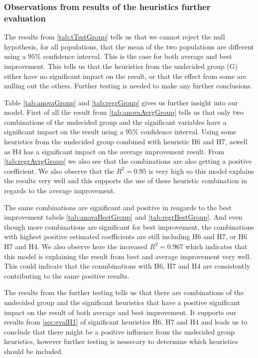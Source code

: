 \documentclass[../main.tex]{subfiles}
\begin{document}
\subsubsection{Observations from results of the heuristics further evaluation}
The results from \cref{tab:tTestGroup} tells us that we cannot reject the null hypothesis, for all populations, that the mean of the two populations are different using a $95\%$ confidence interval. This is the case for both average and best improvement.
This tells us that the heuristics from the undecided group (G) either have no significant impact on the result, or that the effect from some are nulling out the others. Further testing is needed to make any further conclusions. \par
Table \ref{tab:anovaGroup} and \cref{tab:regrGroup} gives us further insight into our model.
First of all the result from \cref{tab:anovaAvrgGroup} tells us that only two combinations of the undecided group and the significant variables have a significant impact on the result using a $95\%$ confidence interval.
Using some heuristics from the undecided group combined with heuristic H6 and H7, aswell as H4 has a significant impact on the average improvement result.
From \cref{tab:regrAvrgGroup} we also see that the combinations are also getting a positive coefficient.
We also observe that the $R^2 = 0.95$ is very high so this model explains the results very well and this supports the use of these heuristic combination in regards to the average improvement.
\par
The same combinations are significant and positive in reagards to the best improvement tabels \cref{tab:anovaBestGroup} and \cref{tab:regrBestGroup}.
And even though more combinations are significant for best improvement, the combinations with highest positive estimated coefficients are still including H6 and H7, or H6 H7 and H4.
We also observe here the increased $R^2 = 0.967$ which indicates that this model is explaining the result from best and average improvement very well.
This could indicate that the conmbinations with H6, H7 and H4 are consistently contributing to the same positive results.
\par
The results from the further testing tells us that there are combinations of the undecided group and the significant heuristics that have a positive significant impact on the result of both average and best improvement. 
It supports our results from \cref{sec:evalH1} of significant heuristics H6, H7 and H4 and leads us to conclude that there might be a positive influence from the undecided group heuristics, however further testing is nessecary to determine which heuristics should be included. 
\end{document}
